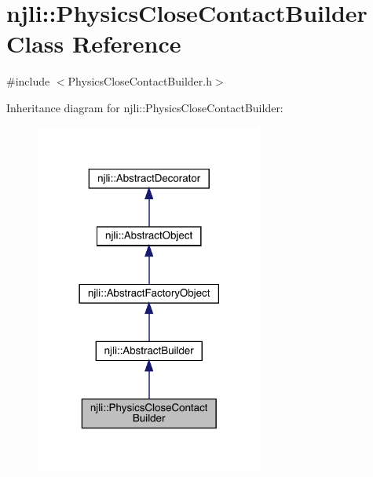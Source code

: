 \hypertarget{classnjli_1_1_physics_close_contact_builder}{}\section{njli\+:\+:Physics\+Close\+Contact\+Builder Class Reference}
\label{classnjli_1_1_physics_close_contact_builder}


{\ttfamily \#include $<$Physics\+Close\+Contact\+Builder.\+h$>$}



Inheritance diagram for njli\+:\+:Physics\+Close\+Contact\+Builder\+:\nopagebreak
\begin{figure}[H]
\begin{center}
\leavevmode
\includegraphics[width=213pt]{classnjli_1_1_physics_close_contact_builder__inherit__graph}
\end{center}
\end{figure}


